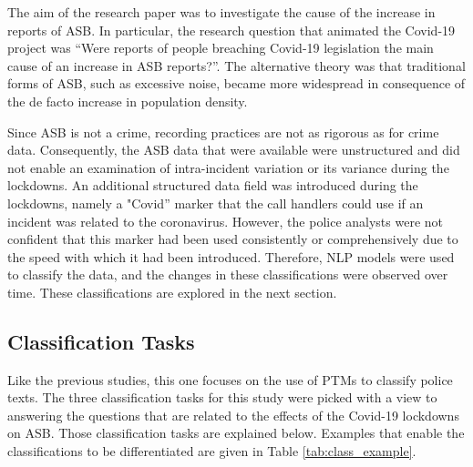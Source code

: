 The aim of the research paper was to investigate the cause of the increase in reports of ASB. In particular, the research question that animated the Covid-19 project was “Were reports of people breaching Covid-19 legislation the main cause of an increase in ASB reports?”. The alternative theory was that traditional forms of ASB, such as excessive noise, became more widespread in consequence of the de facto increase in population density.

Since ASB is not a crime, recording practices are not as rigorous as for crime data. Consequently, the ASB data that were available were unstructured and did not enable an examination of intra-incident variation or its variance during the lockdowns. An additional structured data field was introduced during the lockdowns, namely a "Covid” marker that the call handlers could use if an incident was related to the coronavirus. However, the police analysts were not confident that this marker had been used consistently or comprehensively due to the speed with which it had been introduced. Therefore, NLP models were used to classify the data, and the changes in these classifications were observed over time. These classifications are explored in the next section.

 
\subsection{Classification Tasks} Like the previous studies, this one focuses on the use of PTMs to classify police texts. The three classification tasks for this study were picked with a view to answering the questions that are related to the effects of the Covid-19 lockdowns on ASB. Those classification tasks are explained below. Examples that enable the classifications to be differentiated are given in Table \ref{tab:class_example}.

